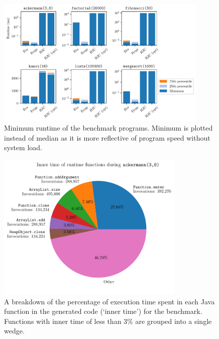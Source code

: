 \documentclass[dissertation.tex]{subfiles}
\begin{document}
{{        \begin{minipage}[t]{\textwidth}
        \begin{figure}[H]
            \centering
            \captionsetup{width=0.8\textwidth}
            \includegraphics[width=0.9\textwidth]{graphs/perf.pdf}
            \caption{Minimum runtime of the benchmark programs. Minimum is plotted instead of median as it is more reflective of program speed without system load.}
            \label{fig:perf}
        \end{figure}
        \begin{figure}[H]
            \centering
            \captionsetup{width=0.9\textwidth}
            \includegraphics[width=0.8\textwidth]{graphs/perf_profile_ackermann.pdf}
            \caption{A breakdown of the percentage of execution time spent in each Java function in the generated code (`inner time') for the  benchmark. Functions with inner time of less than 3\% are grouped into a single wedge.}
            \label{fig:inner-time}
        \end{figure}
        \end{minipage}

}}
\end{document}
